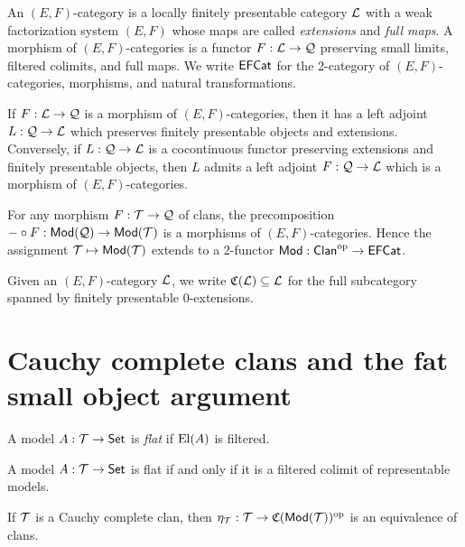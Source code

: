 \documentclass[a4paper]{article}
\begin{document}
\begin{definition}
  An $(E,F)$-category is a locally finitely presentable category $\mathcal{L}$ with a weak factorization system $(E,F)$ whose maps are called \emph{extensions} and \emph{full maps}.
  A morphism of $(E,F)$-categories is a functor $F : \mathcal{L} \to \mathcal{Q}$ preserving small limits, filtered colimits, and full maps.
  We write $\mathsf{EFCat}$ for the 2-category of $(E,F)$-categories, morphisms, and natural transformations.
\end{definition}

\begin{lemma}
  If $F : \mathcal{L} \to \mathcal{Q}$ is a morphism of $(E,F)$-categories, then it has a left adjoint $L : \mathcal{Q} \to \mathcal{L}$ which preserves finitely presentable objects and extensions.
  Conversely, if $L : \mathcal{Q} \to \mathcal{L}$ is a cocontinuous functor preserving extensions and finitely presentable objects, then $L$ admits a left adjoint $F : \mathcal{Q} \to \mathcal{L}$ which is a morphism of $(E,F)$-categories.
\end{lemma}

\begin{lemma}
  For any morphism $F : \mathcal{T} \to \mathcal{Q}$ of clans, the precomposition $- \circ F : \mathsf{Mod}(\mathcal{Q}) \to \mathsf{Mod}(\mathcal{T})$ is a morphisms of $(E,F)$-categories.
  Hence the assignment $\mathcal{T} \mapsto \mathsf{Mod}(\mathcal{T})$ extends to a 2-functor $\mathsf{Mod} : \mathsf{Clan}^{\mathrm{op}} \to \mathsf{EFCat}$.
\end{lemma}

\begin{definition}
  Given an $(E,F)$-category $\mathcal{L}$, we write $\mathfrak{C}(\mathcal{L}) \subseteq \mathcal{L}$ for the full subcategory spanned by finitely presentable $0$-extensions.
\end{definition}

\section{Cauchy complete clans and the fat small object argument}

\begin{definition}
  A model $A : \mathcal{T} \to \mathsf{Set}$ is \emph{flat} if $\operatorname{El}(A)$ is filtered.
\end{definition}

\begin{lemma}
  A model $A : \mathcal{T} \to \mathsf{Set}$ is flat if and only if it is a filtered colimit of representable models.
\end{lemma}

\begin{theorem}
  If $\mathcal{T}$ is a Cauchy complete clan, then $\eta_{\mathcal{T}} : \mathcal{T} \to \mathfrak{C}(\mathsf{Mod}(\mathcal{T}))^{\mathrm{op}}$ is an equivalence of clans.
\end{theorem}
\end{document}
